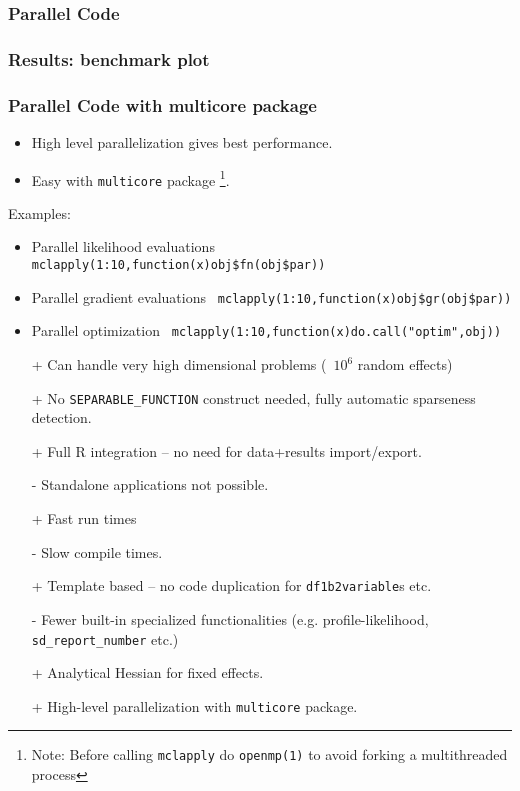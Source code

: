 \documentclass[compress]{beamer}
\begin{document}
\begin{frame}
  \frametitle{Parallel Code}
\end{frame}

\begin{frame}
  \frametitle{Results: benchmark plot}
\end{frame}


\begin{frame}
  \frametitle{Parallel Code with multicore package}
  \begin{itemize}
  \item High level parallelization gives best performance.
  \item Easy with \texttt{multicore} package \footnote{Note: Before
      calling \texttt{mclapply} do \texttt{openmp(1)} to avoid forking a
      multithreaded process}.
  \end{itemize}
  Examples:
  \begin{itemize}
  \item Parallel likelihood evaluations \texttt{
      mclapply(1:10,function(x)obj\$fn(obj\$par))}
  \item Parallel gradient evaluations \texttt{
      mclapply(1:10,function(x)obj\$gr(obj\$par))}
  \item Parallel optimization \texttt{
      mclapply(1:10,function(x)do.call("optim",obj))}
  \end{itemize}
\end{frame}


\begin{frame}
  \begin{itemize}
    \item[+] Can handle very high dimensional problems (~$10^6$ random effects)
    \item[+] No \texttt{SEPARABLE\_FUNCTION} construct needed, fully automatic sparseness detection.
    \item[+] Full R integration -- no need for data+results import/export.
    \item[-] Standalone applications not possible.
    \item[+] Fast run times
    \item[-] Slow compile times.
    \item[+] Template based -- no code duplication for \texttt{df1b2variable}s etc.
    \item[-] Fewer built-in specialized functionalities (e.g. profile-likelihood, \texttt{sd\_report\_number} etc.)
    \item[+] Analytical Hessian for fixed effects.
    \item[+] High-level parallelization with \texttt{multicore} package. 
  \end{itemize}
\end{frame}
\end{document}
